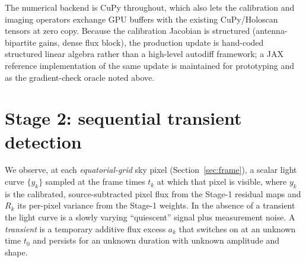 \documentclass[11pt]{article}
\begin{document}
The numerical backend is CuPy throughout, which also lets the calibration and imaging operators
exchange GPU buffers with the existing CuPy/Holoscan tensors at zero copy. Because the calibration
Jacobian is structured (antenna-bipartite gains, dense flux block), the production update is hand-coded
structured linear algebra rather than a high-level autodiff framework; a JAX reference implementation
of the same update is maintained for prototyping and as the gradient-check oracle noted above.

\section{Stage 2: sequential transient detection}
\label{sec:stage2}

We observe, at each \emph{equatorial-grid} sky pixel (Section~\ref{sec:frame}), a scalar light
curve $\{y_k\}$ sampled at the frame times $t_k$ at which that pixel is visible, where $y_k$ is the
calibrated, source-subtracted pixel flux from the Stage-1 residual maps and $R_k$ its per-pixel
variance from the Stage-1 weights. In the absence of a transient the light curve is a slowly
varying ``quiescent'' signal plus measurement noise. A \emph{transient} is a temporary additive
flux excess $a_k$ that switches on at an unknown time $t_0$ and persists for an unknown duration
with unknown amplitude and shape.
\end{document}
